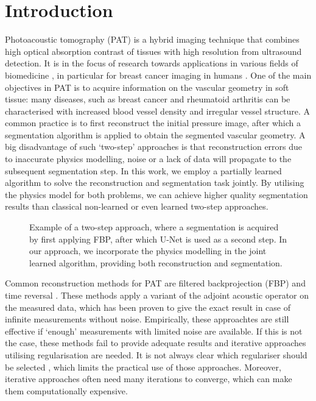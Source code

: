 \documentclass[journal]{IEEEtran}
\begin{document}
\IEEEpeerreviewmaketitle
\vspace{-3mm}
\section{Introduction}
Photoacoustic tomography (PAT) is a hybrid imaging technique that combines high optical absorption contrast of tissues with high resolution from ultrasound detection. It is in the focus of research towards applications in various fields of biomedicine \cite{Zhou2016}, in particular for breast cancer imaging in humans \cite{Heijblom2015, Toi2017, Lin2018}. One of the main objectives in PAT is to acquire information on the vascular geometry in soft tissue: many diseases, such as breast cancer and rheumatoid arthritis can be characterised with increased blood vessel density and irregular vessel structure. A common practice is to first reconstruct the initial pressure image, after which a segmentation algorithm is applied to obtain the segmented vascular geometry. A big disadvantage of such `two-step' approaches is that reconstruction errors due to inaccurate physics modelling, noise or a lack of data will propagate to the subsequent segmentation step. In this work, we employ a partially learned algorithm to solve the reconstruction and segmentation task jointly. By utilising the physics model for both problems, we can achieve higher quality segmentation results than classical non-learned or even learned two-step approaches.

\begin{figure}[!ht]
\resizebox{\linewidth}{!}{%
\begin{tikzpicture}

\end{tikzpicture}}
\caption{Example of a two-step approach, where a segmentation is acquired by first applying FBP, after which U-Net is used as a second step. In our approach, we incorporate the physics modelling in the joint learned algorithm, providing both reconstruction and segmentation.}
\label{ref:UNet_vs_LPD}
\end{figure}

Common reconstruction methods for PAT are filtered backprojection (FBP) \cite{Kruger1995, Finch2004, Willemink2010, Haltmeier2014} and time reversal \cite{Burgholzer2007, Treeby2010}. These methods apply a variant of the adjoint acoustic operator on the measured data, which has been proven to give the exact result in case of infinite measurements without noise. Empirically, these approachtes are still effective if `enough' measurements with limited noise are available. If this is not the case, these methods fail to provide adequate results and iterative approaches utilising regularisation \cite{Dean-Ben2012a, Huang2013, Arridge2016a, Arridge2016b, Boink2018, Nguyen2018, Frikel2018} are needed. It is not always clear which regulariser should be selected \cite{Boink2018}, which limits the practical use of those approaches. Moreover, iterative approaches often need many iterations to converge, which can make them computationally expensive.
\end{document}
